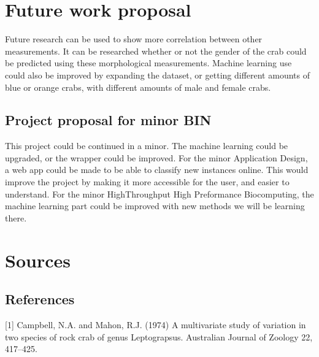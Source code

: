 \documentclass[
]{article}
\begin{document}
\hypertarget{future-work-proposal}{%
\section{Future work proposal}\label{future-work-proposal}}

Future research can be used to show more correlation between other
measurements. It can be researched whether or not the gender of the crab
could be predicted using these morphological measurements. Machine
learning use could also be improved by expanding the dataset, or getting
different amounts of blue or orange crabs, with different amounts of
male and female crabs.

\hypertarget{project-proposal-for-minor-bin}{%
\subsection{Project proposal for minor
BIN}\label{project-proposal-for-minor-bin}}

This project could be continued in a minor. The machine learning could
be upgraded, or the wrapper could be improved. For the minor Application
Design, a web app could be made to be able to classify new instances
online. This would improve the project by making it more accessible for
the user, and easier to understand. For the minor HighThroughput High
Preformance Biocomputing, the machine learning part could be improved
with new methods we will be learning there.

\newpage

\hypertarget{sources}{%
\section{Sources}\label{sources}}

\hypertarget{references}{%
\subsection{References}\label{references}}

{[}1{]} Campbell, N.A. and Mahon, R.J. (1974) A multivariate study of
variation in two species of rock crab of genus Leptograpsus. Australian
Journal of Zoology 22, 417--425.
\end{document}
